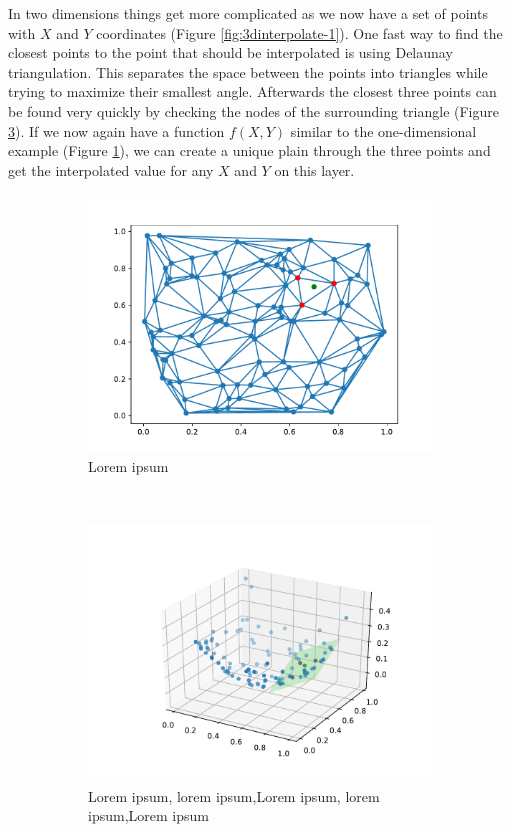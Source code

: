 In two dimensions things get more complicated as we now have a set of points with $X$ and $Y$ coordinates (Figure \ref{fig:3dinterpolate-1}). One fast way to find the closest points to the point that should be interpolated is using Delaunay triangulation. This separates the space between the points into triangles while trying to maximize their smallest angle. Afterwards the closest three points can be found very quickly by checking the nodes of the surrounding triangle  (Figure \ref{fig:3dinterpolate-2}). If we now again have a function $f(X,Y)$ similar to the one-dimensional example (Figure \ref{fig:3dinterpolate-3}), we can create a unique plain through the three points and get the interpolated value for any $X$ and $Y$ on this layer.


\begin{figure}[h] %
	\centering
	\begin{subfigure}[t]{0.5\textwidth}
		\centering
		\includegraphics[width=\linewidth]{images/vis2d2.pdf}
		\caption{Lorem ipsum}
	\label{fig:3dinterpolate-3}
	\end{subfigure}%
	~ 
	\begin{subfigure}[t]{0.5\textwidth}
		\centering
		\includegraphics[width=\linewidth]{images/vis2d3.pdf}
		\caption{Lorem ipsum, lorem ipsum,Lorem ipsum, lorem ipsum,Lorem ipsum}
		\label{fig:3dinterpolate-2}
	\end{subfigure}
	\caption{}


\end{figure}
